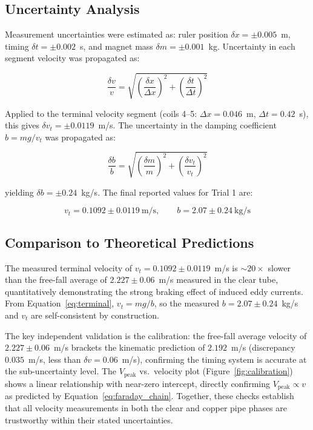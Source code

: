 \documentclass[11pt]{article}
\begin{document}
\subsection{Uncertainty Analysis}

Measurement uncertainties were estimated as: ruler position $\delta x = \pm 0.005$~m,
timing $\delta t = \pm 0.002$~s, and magnet mass $\delta m = \pm 0.001$~kg. Uncertainty in
each segment velocity was propagated as:

\begin{equation}
    \frac{\delta v}{v} = \sqrt{\left(\frac{\delta x}{\Delta x}\right)^2 +
    \left(\frac{\delta t}{\Delta t}\right)^2}
    \label{eq:v_uncert}
\end{equation}

\noindent Applied to the terminal velocity segment (coils 4--5: $\Delta x = 0.046$~m,
$\Delta t = 0.42$~s), this gives $\delta v_t = \pm 0.0119$~m/s. The uncertainty in the
damping coefficient $b = mg/v_t$ was propagated as:

\begin{equation}
    \frac{\delta b}{b} = \sqrt{\left(\frac{\delta m}{m}\right)^2 +
    \left(\frac{\delta v_t}{v_t}\right)^2}
    \label{eq:b_uncert}
\end{equation}

\noindent yielding $\delta b = \pm 0.24$~kg/s. The final reported values for Trial 1 are:

\begin{equation*}
    v_t = 0.1092 \pm 0.0119~\text{m/s}, \qquad b = 2.07 \pm 0.24~\text{kg/s}
\end{equation*}

\subsection{Comparison to Theoretical Predictions}

The measured terminal velocity of $v_t = 0.1092 \pm 0.0119$~m/s is $\sim\!20\times$
slower than the free-fall average of $2.227 \pm 0.06$~m/s measured in the clear tube,
quantitatively demonstrating the strong braking effect of induced eddy currents. From
Equation~\ref{eq:terminal}, $v_t = mg/b$, so the measured $b = 2.07 \pm 0.24$~kg/s and
$v_t$ are self-consistent by construction.

The key independent validation is the calibration: the free-fall average velocity of
$2.227 \pm 0.06$~m/s brackets the kinematic prediction of $2.192$~m/s (discrepancy
$0.035$~m/s, less than $\delta v = 0.06$~m/s), confirming the timing system is accurate
at the sub-uncertainty level. The $V_\text{peak}$ vs.\ velocity plot
(Figure~\ref{fig:calibration}) shows a linear relationship with near-zero intercept,
directly confirming $V_\text{peak} \propto v$ as predicted by
Equation~\ref{eq:faraday_chain}. Together, these checks establish that all velocity
measurements in both the clear and copper pipe phases are trustworthy within their stated
uncertainties.
\end{document}
